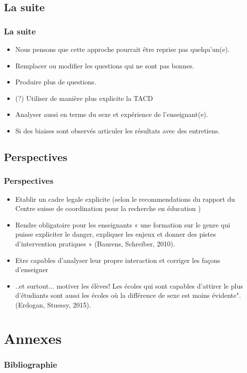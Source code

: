 \documentclass{beamer}
\begin{document}
\subsection{La suite}
\begin{frame}
  \frametitle{La suite}
  \begin{itemize}
  \item Nous pensons que cette approche pourrait être reprise pas quelqu'un(e).
  \item Remplacer ou modifier les questions qui ne sont pas bonnes.
  \item Produire plus de questions.
    \item (?) Utiliser de manière plus explicite la TACD
  \item Analyser aussi en terme du sexe et expérience de l'enseignant(e).
    \item Si des biaises sont observés articuler les résultats avec des entretiens.
  \end{itemize}
\end{frame}

\subsection{Perspectives}
\begin{frame}
  \frametitle{Perspectives}
  \begin{itemize}
  \item Etablir un cadre legale explicite (selon le recommendations du rapport du Centre suisse de coordination pour la recherche en éducation )
  \item Rendre obligatoire pour les enseignants « une formation sur le genre qui puisse expliciter le danger, expliquer les enjeux  et donner des pistes d’intervention pratiques » (Baurens, Schreiber, 2010). 
  \item Etre capables d’analyser leur propre interaction et corriger les façons d’enseigner 
  \item ..et surtout... motiver les élèves!  Les écoles qui sont capables d’attirer le plus d’étudiants sont aussi les écoles où la différence de sexe est  moins évidente". (Erdogan, Stuessy, 2015). 	  
  \end{itemize}
\end{frame}

\section{Annexes}
\begin{frame}
\frametitle{Bibliographie}
\end{frame}
\end{document}
